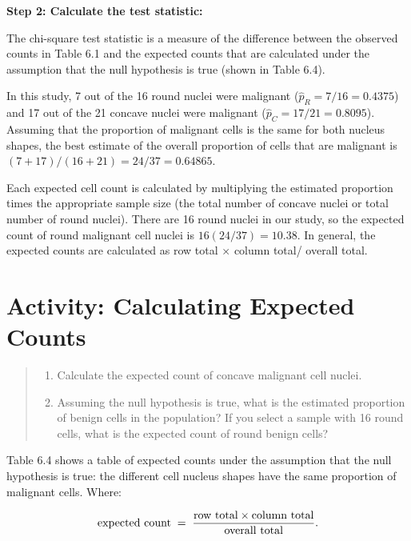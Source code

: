 \documentclass[
]{report}
\providecommand{\tightlist}{%
  \setlength{\itemsep}{0pt}\setlength{\parskip}{0pt}}
\begin{document}
\textbf{Step 2: Calculate the test statistic:}

The chi-square test statistic is a measure of the difference between the observed counts in Table 6.1
and the expected counts that are calculated under the assumption that the null hypothesis is true (shown
in Table 6.4).

In this study, 7 out of the 16 round nuclei were malignant (\(\hat p_R = 7/16= 0.4375\)) and 17 out of the
21 concave nuclei were malignant (\(\hat p_C = 17/21= 0.8095\)). Assuming that the proportion of malignant
cells is the same for both nucleus shapes, the best estimate of the overall proportion of cells that are
malignant is \((7 + 17)/(16 + 21)= 24/37= 0.64865\).

Each expected cell count is calculated by multiplying the estimated proportion times the
­appropriate sample size (the total number of concave nuclei or total number of round nuclei).
There are 16 round nuclei in our study, so the expected count of round malignant cell nuclei is
\(16(24/37)= 10.38\). In general, the expected counts are calculated as row total \(\times\) column total/
overall total.

\section*{Activity: Calculating Expected Counts}\label{activity-calculating-expected-counts}

\begin{quote}
\begin{enumerate}
\def\labelenumi{\arabic{enumi}.}
\setcounter{enumi}{16}
\tightlist
\item
  Calculate the expected count of concave malignant cell nuclei.\\
\item
  Assuming the null hypothesis is true, what is the estimated proportion of benign cells in the population? If you select a sample with 16 round cells, what is the expected count of round benign cells?
\end{enumerate}
\end{quote}

Table 6.4 shows a table of expected counts under the assumption that the null hypothesis is true: the different cell nucleus shapes have the same proportion of malignant cells. Where:

\begin{align}
\text{expected count} \;=\; \frac{\text{row total} \times \text{column total}}{\text{overall total}}.
\notag
\end{align}
\end{document}
